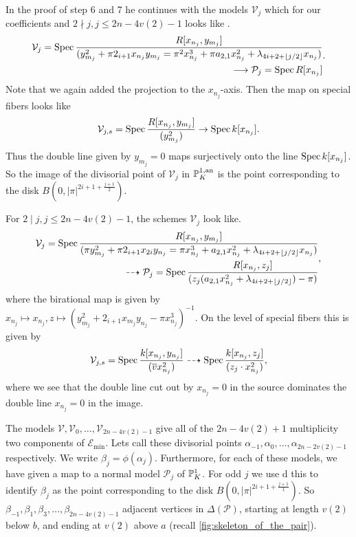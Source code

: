 In the proof of step 6 and 7 he continues with the models $\mathcal{V} _j$ which for our coefficients and $2 \nmid j, j\le 2n - 4v(2) - 1$ looks like . 
\[
	\begin{aligned}
	\mathcal{V} _j = \operatorname{Spec} \frac{R[x_{n_{j}}, y_{m_j}]}{(y_{m_j}^2 + \pi 2_{i + 1} x_{n_j}y_{m_j} = \pi^2 x_{n_j}^3 + \pi a_{2, 1} x_{n_j}^2 + \lambda_{4i + 2 + \left\lfloor j / 2 \right\rfloor} x_{n_j}) } \\ 
	\longrightarrow  \mathcal{P} _{j} = \operatorname{Spec} R[x_{n_j}]
	\end{aligned}
.\] 
Note that we again added the projection to the $x_{n_j}$-axis. 
Then the map on special fibers looks like \[
	\mathcal{V} _{j, s} = \operatorname{Spec} \frac{R[x_{n_j}, y_{m_j}]}{(y_{m_j}^2)} \to \operatorname{Spec} k[x_{n_j}]
.\] 
Thus the double line given by $y_{m_j} = 0$ maps surjectively onto the line $\operatorname{Spec} k[x_{n_j}]$. 
So the image of the divisorial point of $\mathcal{V} _j$ in $\mathbb{P}^{1, \text{an}}_K$ is the point corresponding to the disk $B(0, |\pi|^{2i + 1 + \frac{j + 1}{2}})$. 

For $2 \mid j, j \le 2n - 4v(2) - 1$, the schemes $\mathcal{V} _j$ look like. 
\[
	\begin{aligned}
		\mathcal{V}_j = \operatorname{Spec} \frac{R[x_{n_j},y_{m_j}]}{(\pi y^2_{m_j} + \pi 2_{{i + 1}}x_{2i}y_{n_j} = \pi x_{n_j}^3 + a_{2,1}x_{n_j}^2 + \lambda_{4i + 2 + \left\lfloor j / 2 \right\rfloor} x_{n_j})} \\ \dashrightarrow  \mathcal{P} _{j} =  \operatorname{Spec} \frac{R[ x_{n_j}, z_j]}{(z_j(a_{2,1} x_{n_j}^2 + \lambda_{4i + 2 + \left\lfloor j / 2 \right\rfloor})- \pi)} 
	\end{aligned}
,\]
where the birational map is given by $x_{n_j} \mapsto  x_{n_j}, z \mapsto (y^2_{m_j} + 2_{i + 1 }x_{m_j}y_{n_j} - \pi x_{n_j}^3)^{-1}$. 
On the level of special fibers this is given by \[
	\mathcal{V} _{j, s} = \operatorname{Spec} \frac{k[x_{n_j}, y_{n_j}]}{(\overline{v}x^2_{n_j})} \dashrightarrow \operatorname{Spec} \frac{k[x_{n_j}, z_j]}{(z_j \cdot  x^2_{n_j})}
,\]
where we see that the double line cut out by  $x_{n_j} = 0$ in the source dominates the double line $x_{n_j} = 0$ in the image. 


\bigskip

The models $\mathcal{V} , \mathcal{V} _{0}, \ldots, \mathcal{V} _{2n - 4v(2) - 1}$ give all of the $2n - 4v(2) + 1$ multiplicity two components of  $\mathscr E_\text{min} $. 
Lets call these divisorial points $\alpha_{-1}, \alpha_0, \ldots, \alpha_{2n-2v(2) - 1}$ respectively. 
We write $\beta_j = \phi(\alpha_j)$. 
Furthermore, for each of these models, we have given a map to a normal model $\mathcal{P} _{j}$ of $\mathbb{P}^{1}_{K}$. 
For odd $j$ we use d this to identify $\beta_j$ as the point corresponding to the disk $B(0, |\pi|^{2i + 1 + \frac{j + 1}{1}})$.
So $\beta_{-1}, \beta_1, \beta_{3}, \ldots, \beta_{2n - 4v(2) - 1}$ adjacent vertices in $\Delta(\mathscr P)$, starting at length $v(2)$ below $b$, and ending at $v(2)$ above $a$ (recall \cref{fig:skeleton_of_the_pair}).

